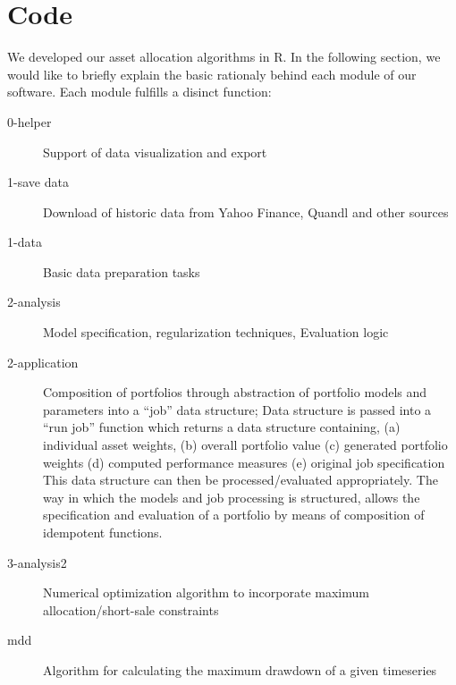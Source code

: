 \documentclass[11pt, parskip=full, DIV=14]{scrreprt}
\begin{document}
\chapter{Code}
We developed our asset allocation algorithms in R. In the following section, we would like to briefly explain the basic rationaly behind each module of our software. Each module fulfills a disinct function:
\begin{description}
  \item[0-helper] Support of data visualization and export
  \item[1-save data] Download of historic data from Yahoo Finance, Quandl and other sources
  \item[1-data] Basic data preparation tasks
  \item[2-analysis] Model specification, regularization techniques, Evaluation logic
  \item[2-application] Composition of portfolios through abstraction of portfolio models and parameters into a ``job'' data structure; Data structure is passed into a ``run job'' function which returns a data structure containing, (a) individual asset weights, (b) overall portfolio value (c) generated portfolio weights (d) computed performance measures (e) original job specification\\ This data structure can then be processed/evaluated appropriately. The way in which the models and job processing is structured, allows the specification and evaluation of a portfolio by means of composition of idempotent functions.
  \item[3-analysis2] Numerical optimization algorithm to incorporate maximum allocation/short-sale constraints
  \item[mdd] Algorithm for calculating the maximum drawdown of a given timeseries
\end{description}














\end{document}
